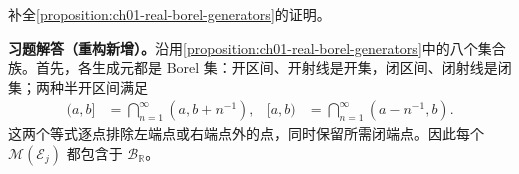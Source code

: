 \documentclass[../../main.tex]{subfiles}%
\begin{document}
\begin{exercise}\label{exercise:ch01-borel-generators-proof}
补全\cref{proposition:ch01-real-borel-generators}的证明。
\end{exercise}
\begin{solution}
\label{solution:ch01-borel-generators-proof}
\textbf{习题解答（重构新增）。}沿用\cref{proposition:ch01-real-borel-generators}中的八个集合族。首先，各生成元都是 Borel 集：开区间、开射线是开集，闭区间、闭射线是闭集；两种半开区间满足
\begin{align*}
(a,b]&=\bigcap_{n=1}^{\infty}(a,b+n^{-1}),&
[a,b)&=\bigcap_{n=1}^{\infty}(a-n^{-1},b).
\end{align*}
这两个等式逐点排除左端点或右端点外的点，同时保留所需闭端点。因此每个 $\mathscr{M}(\mathscr{E}_j)$ 都包含于 $\mathscr{B}_{\mathbb{R}}$。


\end{solution}
\end{document}
